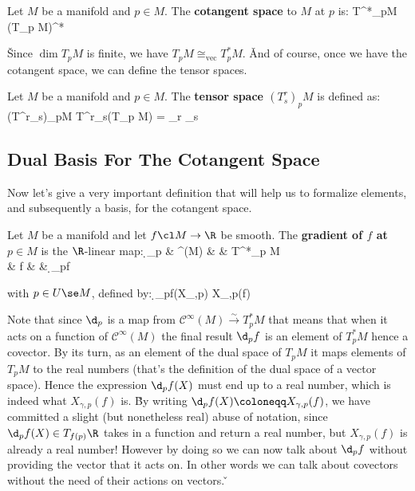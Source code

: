 Let $M$ be a manifold and $p\in M$. The \textbf{cotangent space} to $M$ at $p$ is:
\bse
T^*_pM \coloneqq (T_p M)^*
\ese
\ed

\v

Since $\dim T_p M$ is finite, we have $T_p M\cong_{\mathrm{vec}} T^*_p M$. \v

And of course, once we have the cotangent space, we can define the tensor spaces.

Let $M$ be a manifold and $p\in M$. The \textbf{tensor space $(T^r_s)_p M$} is defined as:
\bse
(T^r_s)_pM \coloneqq T^r_s(T_p M) = _{r } \otimes
{}_{s }
\ese
\ed

\subsection{Dual Basis For The Cotangent Space}

Now let's give a very important definition that will help us to formalize elements, and subsequently a basis, for the
cotangent space.

\bd [Gradient]
Let $M$ be a manifold and let $f\cl M \to\R$ be smooth. The \textbf{gradient of $f$ at $p\in M$} is the $\R$-linear map:
\d_p \cl & ^\infty(M) & \xrightarrow{\sim}& T^*_p M\\ & f & \mapsto & \d_pf
\ei

with $p\in U\se M$, defined by:
\d_pf(X_{\gamma,p}) \coloneqq X_{\gamma,p}(f)
\ei
\ed

Note that since $\d_p$ is a map from $\mathcal{C}^\infty(M) \xrightarrow{\sim} T^*_p M$ that means that when it acts
on a function of $\mathcal{C}^\infty(M)$ the final result $\d_p f$ is an element of $T^*_p M$ hence a covector. By its
turn, as an element of the dual space of $T_p M$ it maps elements of $T_p M$ to the real numbers (that's the definition
of the dual space of a vector space). Hence the expression $\d_p f(X)$ must end up to a real number, which is indeed
what $X_{\gamma,p}(f)$ is. \v

By writing $\d_p f(X) \coloneqq X_{\gamma,p}(f)$, we have committed a slight (but nonetheless real) abuse of
notation, since $\d_p f(X)\in T_{f(p)}\R$ takes in a function and return a real number, but $X_{\gamma,p}(f)$ is
already a real number! However by doing so we can now talk about $\d_p f$ without providing the vector that it acts
on. In other words we can talk about covectors without the need of their actions on vectors. \v

